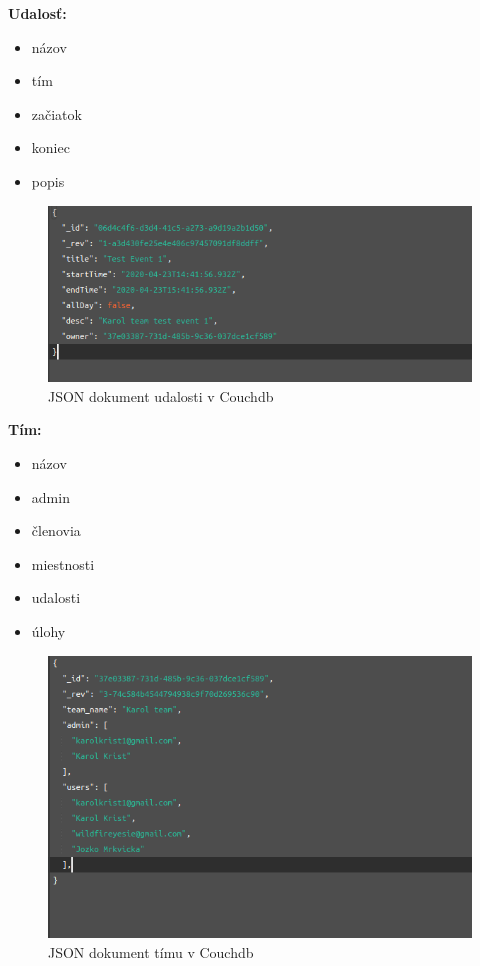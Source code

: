 \textbf{Udalosť:}
\indent\begin{itemize}
    \item názov
    \item tím 
    \item začiatok
    \item koniec
    \item popis 
\end{itemize}

\begin{figure}[H]
    \centering
    \includegraphics[scale=0.50]{img/imp/db_event.png}
    \caption{JSON dokument udalosti v Couchdb}
    \label{fig:db_event}
\end{figure}

\textbf{Tím:}
\indent\begin{itemize}
    \item názov
    \item admin 
    \item členovia  
    \item miestnosti 
    \item udalosti 
    \item úlohy 
\end{itemize}

\begin{figure}[H]
    \centering
    \includegraphics[scale=0.50]{img/imp/db_team.png}
    \caption{JSON dokument tímu v Couchdb}
    \label{fig:db_team}
\end{figure}

